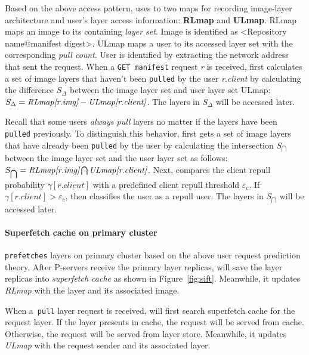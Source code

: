 Based on the above access pattern, 
\sysname uses to two maps for recording image-layer architecture and user's layer access information:
\textbf{RLmap} and \textbf{ULmap}.
 RLmap maps an image to its containing \emph{layer set}.
 Image is identified as \textless Repository name@manifest digest\textgreater.
ULmap maps a user to its accessed layer set with the corresponding \emph{pull count}.
 User is identified by extracting the network address that sent the request. 
 When a \texttt{GET manifest} request \emph{r} is received,
\sysname first calculates a set of image layers that haven't been \texttt{pulled} by the user \emph{r.client} by 
calculating the difference $S_{\Delta}$ between the image layer set and user layer set ULmap:
$ S_{\Delta} = \emph{RLmap[r.img]} - \emph{ULmap[r.client]}$.
The layers in $S_{\Delta}$ will be accessed later.

Recall that some users \emph{always pull} layers no matter if the layers have been \texttt{pulled} previously.
To distinguish this behavior,  
\sysname first gets a set of image layers that have already been \texttt{pulled} by the user by calculating the 
intersection $S_{\bigcap}$ between the image layer set and the user layer set as follows:
$S_{\bigcap} = \emph{RLmap[r.img]} \bigcap \emph{ULmap[r.client]} $.
Next, 
\sysname compares the client repull probability $\gamma[r.client]$ with a predefined client repull threshold $\varepsilon_{c}$.
If $\gamma[r.client] > \varepsilon_{c}$, 
then \sysname classifies the user as a repull user.
The layers in $S_{\bigcap}$ will be accessed later.

%

\paragraph{Superfetch cache  on primary cluster} 
\sysname \texttt{prefetches} layers on primary cluster based on the above user request prediction theory.
After P-servers receive the primary layer replicas,
\sysname will save the layer replicas into \emph{superfetch cache} as shown in Figure~\ref{fig:sift}.
Meanwhile, it updates \emph{RLmap} with the layer and its associated image. 

When a~\texttt{pull} layer request is received, 
\sysname will first search superfetch cache for the request layer.
If the layer presents in cache, the request will be served from cache.
Otherwise,
the request will be served from layer store.
Meanwhile, it updates \emph{ULmap} with the request sender and its associated layer. 

